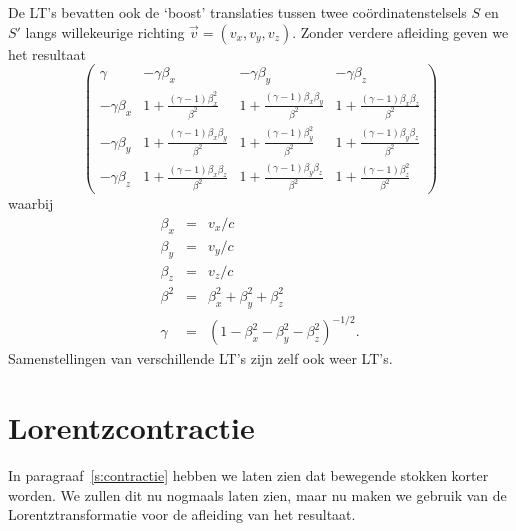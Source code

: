 De LT's bevatten ook de `boost' translaties tussen twee co\"ordinatenstelsels $S$ en $S'$ langs
 willekeurige richting $\vec{v}=(v_x,v_y,v_z)$. 
Zonder verdere afleiding geven we het resultaat
\begin{equation}
\left( \begin{array}{cccc} 
    \gamma & -\gamma\beta_x & -\gamma\beta_y & -\gamma\beta_z \\
    -\gamma\beta_x & 1+\frac{(\gamma-1)\beta_x^2}{\beta^2} & 1+\frac{(\gamma-1)\beta_x\beta_y}{\beta^2} & 1+\frac{(\gamma-1)\beta_x\beta_z}{\beta^2} \\
    -\gamma\beta_y & 1+\frac{(\gamma-1)\beta_x\beta_y}{\beta^2} & 1+\frac{(\gamma-1)\beta_y^2}{\beta^2} & 1+\frac{(\gamma-1)\beta_y\beta_z}{\beta^2}\\
    -\gamma\beta_z & 1+\frac{(\gamma-1)\beta_x\beta_z}{\beta^2} & 1+\frac{(\gamma-1)\beta_y\beta_z}{\beta^2} & 1+\frac{(\gamma-1)\beta_z^2}{\beta^2}
 \end{array} \right)
\end{equation}
waarbij
\begin{eqnarray}
\beta_x & = & v_x/c \\ \nonumber
\beta_y & = & v_y/c \\ \nonumber
\beta_z & = & v_z/c \\ \nonumber
\beta^2 & = & \beta_x^2 + \beta_y^2 + \beta_z^2 \\\nonumber
\gamma & = & (1-\beta_x^2-\beta_y^2-\beta_z^2)^{-1/2}.\nonumber
\end{eqnarray}
Samenstellingen van verschillende LT's zijn zelf ook weer LT's.



\section{Lorentzcontractie}
In paragraaf~\ref{s:contractie} hebben we laten zien dat bewegende
stokken korter worden. We zullen dit nu nogmaals laten zien, maar nu
maken we gebruik van de Lorentztransformatie voor de afleiding van het
resultaat. 

